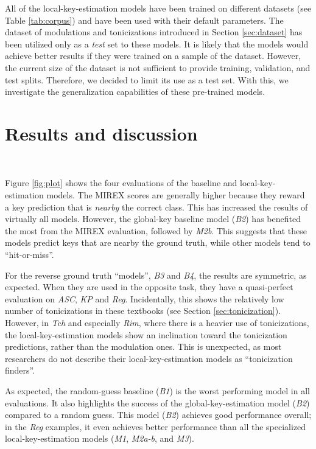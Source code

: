 \documentclass[sigconf]{acmart}
\begin{document}
All of the local-key-estimation models have been trained on different datasets (see Table \ref{tab:corpus}) and have been used with their default parameters. 
The dataset of modulations and tonicizations introduced in Section \ref{sec:dataset} has been utilized only as a \emph{test} set to these models. 
It is likely that the models would achieve better results if they were trained on a sample of the dataset. 
However, the current size of the dataset is not sufficient to provide training, validation, and test splits. 
Therefore, we decided to limit its use as a test set. With this, we investigate the generalization capabilities of these pre-trained models. 

\section{Results and discussion}~\label{sec:res}

Figure \ref{fig:plot} shows the four evaluations of the baseline and local-key-estimation models. 
The MIREX scores are generally higher because they reward a key prediction that is \emph{nearby} the correct class. 
This has increased the results of virtually all models. However, the global-key baseline model (\emph{B2}) has benefited the most from the MIREX evaluation, followed by \emph{M2b}. 
This suggests that these models predict keys that are nearby the ground truth, while other models tend to ``hit-or-miss''. 

For the reverse ground truth ``models'', \emph{B3} and \emph{B4}, the results are symmetric, as expected. 
When they are used in the opposite task, they have a quasi-perfect evaluation on \emph{ASC}, \emph{KP} and \emph{Reg}. 
Incidentally, this shows the relatively low number of tonicizations in these textbooks (see Section \ref{sec:tonicization}). 
However, in \emph{Tch} and especially \emph{Rim}, where there is a heavier use of tonicizations, the local-key-estimation models show an inclination toward the tonicization predictions, rather than the modulation ones. 
This is unexpected, as most researchers do not describe their local-key-estimation models as ``tonicization finders''.

As expected, the random-guess baseline (\emph{B1}) is the worst performing model in all evaluations. 
It also highlights the success of the global-key-estimation model (\emph{B2}) compared to a random guess. This model (\emph{B2}) achieves good performance overall; in the \emph{Reg} examples, it even achieves better performance than all the specialized local-key-estimation models (\emph{M1}, \emph{M2a-b}, and \emph{M3}). 
\end{document}
